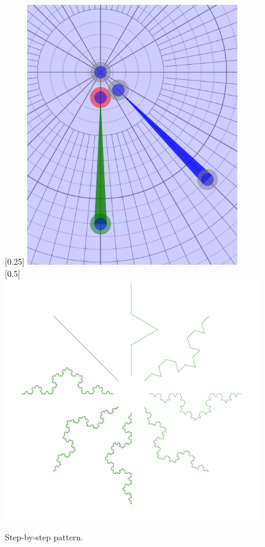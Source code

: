 	    \begin{figure}[H]
	    	\centering
	    	\caption{\label{step_03} Step-by-step pattern.}
	    	[0.25\TW]
                {\includegraphics[width=0.25\TW]{img/Advanced_Techniques/Step/step_set_03.png}}
            ~
            [0.5\TW]
                {\includegraphics[width=0.5\TW]{img/Advanced_Techniques/Step/step_03.png}}
	    \end{figure}

